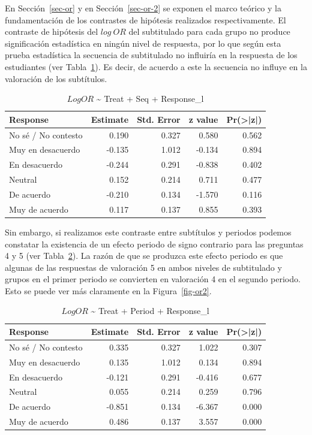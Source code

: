\documentclass[
  12pt,
  a4paper,
  extrafontsizes,
  onecolumn,
  openright]{memoir}
\begin{document}
En Sección~\ref{sec-or} y en Sección~\ref{sec-or-2} se exponen el marco
teórico y la fundamentación de los contrastes de hipótesis realizados
respectivamente. El contraste de hipótesis del \(log\ OR\) del
subtitulado para cada grupo no produce significación estadística en
ningún nivel de respuesta, por lo que según esta prueba estadística la
secuencia de subtitulado no influiría en la respuesta de los estudiantes
(ver Tabla~\ref{tbl-logor1}). Es decir, de acuerdo a este la secuencia
no influye en la valoración de los subtítulos.

\hypertarget{tbl-logor1}{}
\begin{longtable}{lrrrr}
\caption{\label{tbl-logor1}\(Log OR\) \textasciitilde{} Treat + Seq + Response\_l }\tabularnewline

\toprule
Response & Estimate & Std. Error & z value & Pr(>|z|) \\ 
\midrule
No sé / No contesto & 0.190 & 0.327 & 0.580 & 0.562 \\ 
Muy en desacuerdo & -0.135 & 1.012 & -0.134 & 0.894 \\ 
En desacuerdo & -0.244 & 0.291 & -0.838 & 0.402 \\ 
Neutral & 0.152 & 0.214 & 0.711 & 0.477 \\ 
De acuerdo & -0.210 & 0.134 & -1.570 & 0.116 \\ 
Muy de acuerdo & 0.117 & 0.137 & 0.855 & 0.393 \\ 
\bottomrule
\end{longtable}

Sin embargo, si realizamos este contraste entre subtítulos y periodos
podemos constatar la existencia de un efecto periodo de signo contrario
para las preguntas 4 y 5 (ver Tabla~\ref{tbl-logor2}). La razón de que
se produzca este efecto periodo es que algunas de las respuestas de
valoración 5 en ambos niveles de subtitulado y grupos en el primer
periodo se convierten en valoración 4 en el segundo periodo. Esto se
puede ver más claramente en la Figura~\ref{fig-or2}.

\hypertarget{tbl-logor2}{}
\begin{longtable}{lrrrr}
\caption{\label{tbl-logor2}\(Log OR\) \textasciitilde{} Treat + Period + Response\_l }\tabularnewline

\toprule
Response & Estimate & Std. Error & z value & Pr(>|z|) \\ 
\midrule
No sé / No contesto & 0.335 & 0.327 & 1.022 & 0.307 \\ 
Muy en desacuerdo & 0.135 & 1.012 & 0.134 & 0.894 \\ 
En desacuerdo & -0.121 & 0.291 & -0.416 & 0.677 \\ 
Neutral & 0.055 & 0.214 & 0.259 & 0.796 \\ 
De acuerdo & -0.851 & 0.134 & -6.367 & 0.000 \\ 
Muy de acuerdo & 0.486 & 0.137 & 3.557 & 0.000 \\ 
\bottomrule
\end{longtable}
\end{document}
